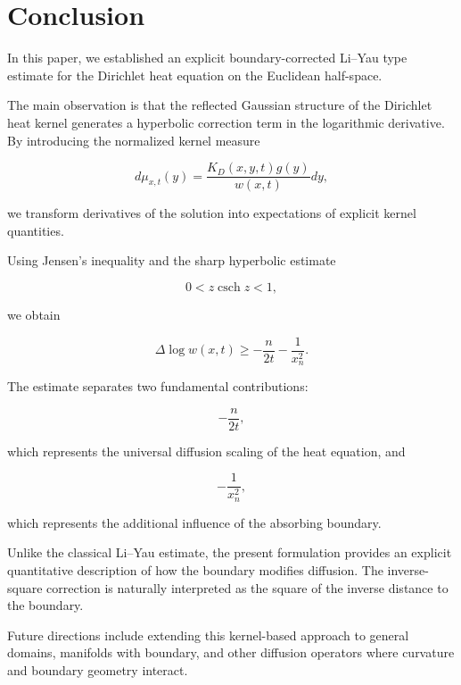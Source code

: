 \documentclass[11pt]{amsart}
\DeclareMathOperator{\csch}{csch}
\theoremstyle{definition}
\theoremstyle{remark}
\begin{document}
\section{Conclusion}


In this paper, we established an explicit boundary-corrected
Li--Yau type estimate for the Dirichlet heat equation on the
Euclidean half-space.

The main observation is that the reflected Gaussian structure of the
Dirichlet heat kernel generates a hyperbolic correction term in the
logarithmic derivative. By introducing the normalized kernel measure

\[
d\mu_{x,t}(y)
=
\frac{
K_D(x,y,t)g(y)
}{
w(x,t)
}
dy ,
\]

we transform derivatives of the solution into expectations of
explicit kernel quantities.

Using Jensen's inequality and the sharp hyperbolic estimate

\[
0<z\csch z<1,
\]

we obtain

\[
\boxed{
\Delta\log w(x,t)
\geq
-\frac n{2t}
-\frac1{x_n^2}
}.
\]


The estimate separates two fundamental contributions:

\[
-\frac n{2t},
\]

which represents the universal diffusion scaling of the heat
equation, and

\[
-\frac1{x_n^2},
\]

which represents the additional influence of the absorbing boundary.

Unlike the classical Li--Yau estimate, the present formulation
provides an explicit quantitative description of how the boundary
modifies diffusion. The inverse-square correction is naturally
interpreted as the square of the inverse distance to the boundary.

Future directions include extending this kernel-based approach to
general domains, manifolds with boundary, and other diffusion
operators where curvature and boundary geometry interact.
\end{document}
